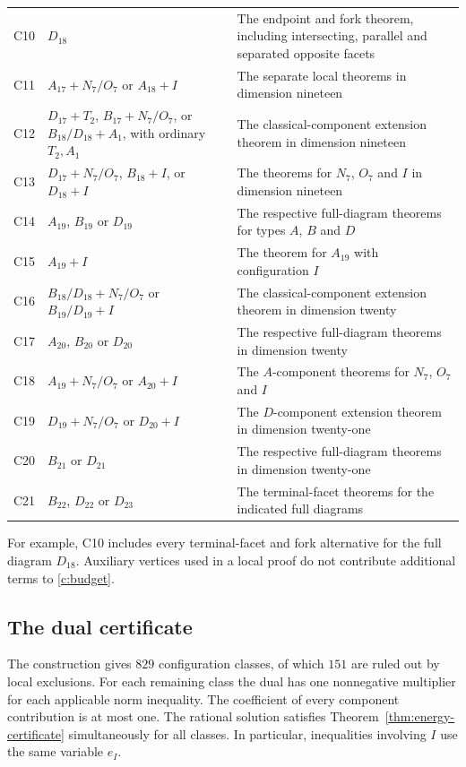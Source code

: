 \documentclass[11pt]{article}
\theoremstyle{definition}
\theoremstyle{remark}
\numberwithin{equation}{section}
\begin{document}
\begin{longtable}{>{\raggedright\arraybackslash}p{.08\linewidth}
 >{\raggedright\arraybackslash}p{.43\linewidth}
 >{\raggedright\arraybackslash}p{.39\linewidth}}
C10&$D_{18}$&The endpoint and fork theorem, including intersecting, parallel and separated opposite facets\\
C11&$A_{17}+N_7/O_7$ or $A_{18}+I$&
 The separate local theorems in dimension nineteen\\
C12&$D_{17}+T_2$, $B_{17}+N_7/O_7$, or
 $B_{18}/D_{18}+A_1$, with ordinary $T_2,A_1$&
 The classical-component extension theorem in dimension nineteen\\
C13&$D_{17}+N_7/O_7$, $B_{18}+I$, or $D_{18}+I$&
 The theorems for $N_7$, $O_7$ and $I$ in dimension nineteen\\
C14&$A_{19}$, $B_{19}$ or $D_{19}$&
 The respective full-diagram theorems for types $A$, $B$ and $D$\\
C15&$A_{19}+I$&The theorem for $A_{19}$ with configuration $I$\\
C16&$B_{18}/D_{18}+N_7/O_7$ or $B_{19}/D_{19}+I$&
 The classical-component extension theorem in dimension twenty\\
C17&$A_{20}$, $B_{20}$ or $D_{20}$&
 The respective full-diagram theorems in dimension twenty\\
C18&$A_{19}+N_7/O_7$ or $A_{20}+I$&
 The $A$-component theorems for $N_7$, $O_7$ and $I$\\
C19&$D_{19}+N_7/O_7$ or $D_{20}+I$&
 The $D$-component extension theorem in dimension twenty-one\\
C20&$B_{21}$ or $D_{21}$&
 The respective full-diagram theorems in dimension twenty-one\\
C21&$B_{22}$, $D_{22}$ or $D_{23}$&
 The terminal-facet theorems for the indicated full diagrams\\\bottomrule
\end{longtable}

For example, C10 includes every terminal-facet and fork alternative
for the full diagram $D_{18}$. Auxiliary vertices used in a local
proof do not contribute additional terms to \eqref{c:budget}.

\subsection{The dual certificate}
\label{c:certificate}

The construction gives $829$ configuration classes, of which $151$
are ruled out by local exclusions. For each remaining class the dual
has one nonnegative multiplier for each applicable norm inequality.
The coefficient of every component contribution is at most one.
The rational solution satisfies
Theorem~\ref{thm:energy-certificate} simultaneously for all classes.
In particular, inequalities involving $I$ use the same variable $e_I$.
\end{document}
